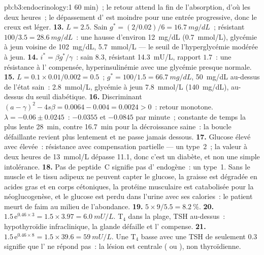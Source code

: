 \begin{solution}{pb:b3:endocrinology:1}
60 min)~; le retour attend la fin de l'absorption, d'où les deux
heures~; le dépassement d' est moindre pour une entrée
progressive, donc le creux est léger.
\textbf{13.} $L = 2.5$. Sain $g^{*} = (2/0.02)/6 = \qty{16.7}{mg/dL}$~;
résistant $100/3.5 = \qty{28.6}{mg/dL}$~: une hausse d'environ
\qty{12}{mg/dL} (\qty{0.7}{mmol/L}), glycémie à jeun voisine de
\qty{102}{mg/dL}, \qty{5.7}{mmol/L} --- le seuil de l'hyperglycémie
modérée à jeun.
\textbf{14.} $i^{*} = \beta g^{*}/\gamma$~: sain $8.3$, résistant
\qty{14.3}{mU/L}, rapport $1.7$~: une résistance à l' compensée,
hyperinsulinémie avec une glycémie presque normale.
\textbf{15.} $L = 0.1\times 0.01/0.002 = 0.5$~; $g^{*} = 100/1.5 =
\qty{66.7}{mg/dL}$, \qty{50}{mg/dL} au-dessus de l'état sain~:
\qty{2.8}{mmol/L}, glycémie à jeun \qty{7.8}{mmol/L} (\qty{140}{mg/dL}),
au-dessus du seuil diabétique.
\textbf{16.} Discriminant $(a - \gamma)^{2} - 4s\beta = 0.0064 - 0.004 =
0.0024 > 0$~: retour monotone. $\lambda = -0.06 \pm 0.0245$~: $-0.0355$
et $-0.0845$ par minute~; constante de temps la plus lente \qty{28}{min},
contre \qty{16.7}{min} pour la décroissance saine~: la boucle
défaillante revient plus lentement et ne passe jamais dessous.
\textbf{17.} Glucose élevé avec  élevée~: résistance avec
compensation partielle --- un type~2~; la valeur à deux heures de
\qty{13}{mmol/L} dépasse \qty{11.1}{}, donc c'est un diabète, et non une
simple intolérance.
\textbf{18.} Pas de peptide~C signifie pas d' endogène~: un
type~1. Sans  le muscle et le tissu adipeux ne peuvent capter le
glucose, la graisse est dégradée en acides gras et en corps cétoniques,
la protéine musculaire est catabolisée pour la néoglucogenèse, et le
glucose est perdu dans l'urine avec ses calories~: le patient meurt de
faim au milieu de l'abondance.
\textbf{19.} $5\times 9/5.5 = \qty{8.2}{\%}$.
\textbf{20.} $1.5\,\mathrm{e}^{0.46\times 3} = 1.5\times 3.97 =
\qty{6.0}{mU/L}$. T$_{4}$ dans la plage, TSH au-dessus~: hypothyroïdie
infraclinique, la glande défaille et l' compense.
\textbf{21.} $1.5\,\mathrm{e}^{0.46\times 8} = 1.5\times 39.6 =
\qty{59}{mU/L}$. Une T$_{4}$ basse avec une TSH de seulement $0.3$
signifie que l' ne répond pas~: la lésion est centrale
( ou ), non thyroïdienne.

\end{solution}

